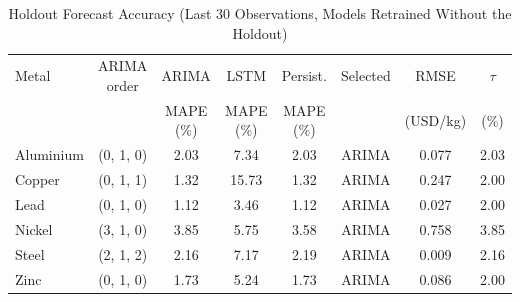 \begin{table}[!t]
\caption{Holdout Forecast Accuracy (Last 30 Observations, Models Retrained Without the Holdout)}
\label{tab:holdout}
\centering
\footnotesize
\setlength{\tabcolsep}{3pt}
\begin{tabular}{lccccccc}
\hline
Metal & ARIMA order & ARIMA & LSTM & Persist. & Selected & RMSE & $\tau$ \\
 & & MAPE (\%) & MAPE (\%) & MAPE (\%) & & (USD/kg) & (\%) \\
\hline
Aluminium & (0, 1, 0) & 2.03 & 7.34 & 2.03 & ARIMA & 0.077 & 2.03 \\
Copper & (0, 1, 1) & 1.32 & 15.73 & 1.32 & ARIMA & 0.247 & 2.00 \\
Lead & (0, 1, 0) & 1.12 & 3.46 & 1.12 & ARIMA & 0.027 & 2.00 \\
Nickel & (3, 1, 0) & 3.85 & 5.75 & 3.58 & ARIMA & 0.758 & 3.85 \\
Steel & (2, 1, 2) & 2.16 & 7.17 & 2.19 & ARIMA & 0.009 & 2.16 \\
Zinc & (0, 1, 0) & 1.73 & 5.24 & 1.73 & ARIMA & 0.086 & 2.00 \\
\hline
\end{tabular}
\end{table}
